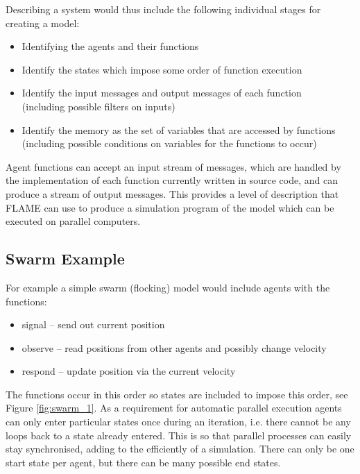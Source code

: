 Describing a system would thus include the following individual stages for creating a model:

\begin{itemize}
\item Identifying the agents and their functions
\item Identify the states which impose some order of function execution
\item Identify the input messages and output messages of each function 
\\(including possible filters on inputs)
\item Identify the memory as the set of variables that are accessed by
functions \\(including possible conditions on variables for the functions to
occur)
\end{itemize}

Agent functions can accept an input stream of messages, which are handled by the
implementation of each function currently written in source code, and can
produce a stream of output messages. This provides a level of description that
FLAME can use to produce a simulation program of the model which can be
executed on parallel computers.

\subsection{Swarm Example}

For example a simple swarm (flocking) model would include agents with the
functions:

\begin{itemize}
\item signal -- send out current position
\item observe -- read positions from other agents and possibly change velocity
\item respond -- update position via the current velocity
\end{itemize}

The functions occur in this order so states are included to impose this
order, see Figure \ref{fig:swarm_1}. As a requirement for automatic parallel
execution agents can only enter particular states once during an iteration,
i.e. there cannot be any loops back to a state already entered. This is so that
parallel processes can easily stay synchronised, adding to the efficiently of a
simulation. There can only be one start state per agent, but there can be many
possible end states.

